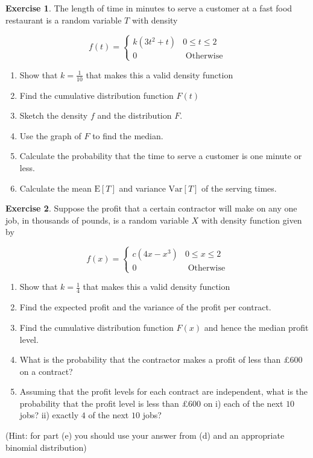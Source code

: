 \documentclass[
]{book}
\theoremstyle{definition}
\theoremstyle{definition}
\theoremstyle{definition}
\newtheorem{exercise}{Exercise}[chapter]
\theoremstyle{definition}
\theoremstyle{remark}
\begin{document}
\begin{exercise}

The length of time in minutes to serve a customer at a fast food restaurant is a random variable \(T\) with density

\begin{equation*}
  f(t)=\begin{cases}
        k(3t^2 + t) & 0 \leq t \leq 2 \\
        0 &  \text{     Otherwise}
  \end{cases}
\end{equation*}

\begin{enumerate}
\def\labelenumi{\alph{enumi})}
\item
  Show that \(k = \frac{1}{10}\) that makes this a valid density function
\item
  Find the cumulative distribution function \(F(t)\)
\item
  Sketch the density \(f\) and the distribution \(F\).
\item
  Use the graph of \(F\) to find the median.
\item
  Calculate the probability that the time to serve a customer is one minute or less.
\item
  Calculate the mean \(\text{E}[T]\) and variance \(\text{Var}[T]\) of the serving times.
\end{enumerate}

\end{exercise}

\begin{exercise}
Suppose the profit that a certain contractor will make on any one job, in thousands of pounds, is a random variable \(X\) with density function given by

\begin{equation*}
  f(x)=\begin{cases}
        c(4x -x^3) & 0 \leq x \leq 2 \\
        0 &  \text{     Otherwise}
  \end{cases}
\end{equation*}

\begin{enumerate}
\def\labelenumi{\alph{enumi})}
\item
  Show that \(k =\frac{1}{4}\) that makes this a valid density function
\item
  Find the expected profit and the variance of the profit per contract.
\item
  Find the cumulative distribution function \(F(x)\) and hence the median profit level.
\item
  What is the probability that the contractor makes a profit of less than £\(600\) on a contract?
\item
  Assuming that the profit levels for each contract are independent, what is the probability that the profit level is less than £\(600\) on
  i) each of the next \(10\) jobs?
  ii) exactly \(4\) of the next \(10\) jobs?
\end{enumerate}

(Hint: for part (e) you should use your answer from (d) and an appropriate binomial distribution)
\end{exercise}
\end{document}

